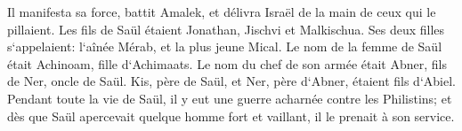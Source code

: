 \verse Il manifesta sa force, battit Amalek, et délivra Israël de la main de ceux qui le pillaient. 
\verse Les fils de Saül étaient Jonathan, Jischvi et Malkischua. Ses deux filles s`appelaient: l`aînée Mérab, et la plus jeune Mical. 
\verse Le nom de la femme de Saül était Achinoam, fille d`Achimaats. Le nom du chef de son armée était Abner, fils de Ner, oncle de Saül. 
\verse Kis, père de Saül, et Ner, père d`Abner, étaient fils d`Abiel. 
\verse Pendant toute la vie de Saül, il y eut une guerre acharnée contre les Philistins; et dès que Saül apercevait quelque homme fort et vaillant, il le prenait à son service. 

\chapter{}

